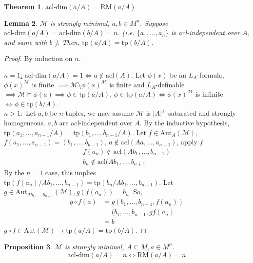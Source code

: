 \documentclass[letterpaper, 12pt]{article}
\newcommand{\cM}{\mathcal{M}}
\newcommand{\Aut}{\mbox{Aut}}
\newcommand{\tp}{\mbox{tp}}
\newcommand{\RM}{\mbox{RM}}
\newcommand{\acl}{\mbox{acl}}
\newcommand{\acldim}{\mbox{acl-dim}}
\theoremstyle{stdthm}
\newtheorem{thm}{Theorem}[section]
\newtheorem{lem}[thm]{Lemma}
\newtheorem{prop}[thm]{Proposition}
\theoremstyle{stddef}
\theoremstyle{stdnonum}
\theoremstyle{stdqands}
\theoremstyle{stdbold}
\begin{document}
\begin{thm}
$\mbox{acl-dim}(a/A) = \RM(a/A)$ 
\end{thm}

\begin{lem}
$\cM$ is strongly minimal, $a,b \in M^n$. Suppose $\acldim(a/A) = \acldim(b/A) = n$. (i.e. $\{a_1,\dots,a_n\}$ is acl-independent over $A$, and same with $b$ ). Then, $\tp(a/A) = \tp(b/A)$. 
\end{lem}

\begin{proof}
By induction on $n$. 

\underline{$n=1$:} $\acldim(a/A) = 1 \iff a \notin \acl(A)$. Let $\phi(x)$ be an $L_A$-formula, $\phi(x)^\cM $ is finite $\implies \cM \setminus \phi(x)^\cM$ is finite and $L_A$-definable $\implies \cM \models \phi(a) \implies \phi \in \tp(a/A)$. $\phi \in \tp(a/A) \iff \phi(x)^\cM$ is infinite $\iff \phi \in \tp(b/A)$. \\

\underline{$n>1:$} Let $a,b$ be $n$-tuples, we may assume $\cM$ is $|A|^+$-saturated and strongly homogeneous. $a,b$ are acl-independent over $A$. By the inductive hypothesis, $\tp(a_1,\dots,a_{n-1}/A) = \tp(b_1,\dots,b_{n-1}/A)$. Let $f \in \Aut_A(\cM)$, $f(a_1,\dots, a_{n-1}) = (b_1,\dots,b_{b-1})$, $a \notin \acl(Aa,\dots, a_{n-1})$, apply $f$
\begin{align*}
f(a_n) \notin \acl(Ab_1,\dots, b_{n-1})\\
b_n \notin \acl(Ab_1,\dots, b_{n+1}
\end{align*}
By the $n=1$ case, this implies $\tp(f(a_n)/Ab_1,\dots,b_{n-1}) = \tp(b_n/Ab_1,\dots, b_{n-1})$. Let $g \in \Aut_{Ab_1,\dots, b_{n-1}}(\cM), g(f(a_n)) = b_n$. So, 
\begin{align*}
g \circ f (a) &= g(b_1,\dots,b_{n-1},f(a_n))\\
&= (b_1,\dots, b_{n-1},gf(a_n) \\
&= b
\end{align*}
$g \circ f \in \Aut(\cM) \to \tp(a/A) = \tp(b/A)$. 
\end{proof}


\begin{prop}
$\cM$ is strongly minimal, $A\subseteq M, a\in M^n$. 
\[ \acldim(a/A) = n \iff \RM(a/A) = n \] 

\end{prop}
\end{document}
